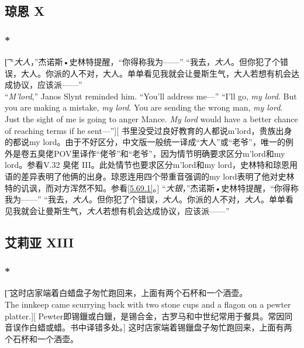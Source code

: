 \documentclass[12pt,a4paper]{article}
\begin{document}
\subsection{琼恩 X}
\subsubsection{\color{red}*}\label{5.73.1}\t[
“\emph{大人}，”杰诺斯•史林特提醒，“你得称我为——”
“我去，\emph{大人}。但你犯了个错误，大人。你派的人不对，大人。单单看见我就会让曼斯生气，大人若想有机会达成协议，应该派——”\\
“\emph{M'lord},” Janos Slynt reminded him. “You'll address me—”
“I'll go, \emph{my lord}. But you are making a mistake, \emph{my lord}. You are sending the wrong man, \emph{my lord}. Just the sight of me is going to anger Mance. \emph{My lord} would have a better chance of reaching terms if he sent—”][
书里没受过良好教育的人都说m'lord，贵族出身的都说my lord。由于不好区分，中文版一般统一译成“大人”或“老爷”，唯一的例外是卷五臭佬POV里译作“佬爷”和“老爷”，因为情节明确要求区分m'lord和my lord。参看V.32 臭佬 III。此处情节也要求区分m'lord和my lord，史林特和琼恩用语的差异表明了他俩的出身。琼恩连用四个带重音强调的my lord表明了他对史林特的讥讽，而对方浑然不知。参看\ref{5.69.1}。]
“\emph{大银}，”杰诺斯•史林特提醒，“你得称我为——”
“我去，\emph{大人}。但你犯了个错误，\emph{大人}。你派的人不对，\emph{大人}。单单看见我就会让曼斯生气，\emph{大人}若想有机会达成协议，应该派——”

\subsection{艾莉亚 XIII}

\subsubsection{\color{red}*}\t[
	这时店家端着白蜡盘子匆忙跑回来，上面有两个石杯和一个酒壶。\\
	The innkeep came scurrying back with two stone cups and a flagon on a pewter platter.][
	Pewter即锡鑞或白鑞，是锡合金，古罗马和中世纪常用于餐具。常因同音误作白蜡或蜡。书中译错多处。]
	这时店家端着锡鑞盘子匆忙跑回来，上面有两个石杯和一个酒壶。
	
\end{document}
